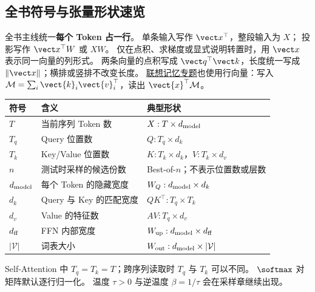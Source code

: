 \subsection{全书符号与张量形状速览}
\label{app:symbols}
全书主线统一\textbf{每个 Token 占一行}。
单条输入写作 $\vect x^\top$，整段输入为 $X$；
投影写作 $\vect x^\top W$ 或 $XW$。
仅在点积、求梯度或显式说明转置时，用 $\vect x$ 表示同一向量的列形式。
两条向量的点积写成 $\vect q^\top\vect k$，长度统一写成 $\|\vect x\|$；横排或竖排不改变长度。
\hyperref[intro:04-key-value-outer-product]{联想记忆专题}也使用行向量：写入 $\mathcal{M}=\sum_i \vect{k}_i\vect{v}_i^\top$，读出 $\vect{x}^\top\mathcal{M}$。

\begin{center}\small
\renewcommand{\arraystretch}{1.25}
\begin{tabularx}{\linewidth}{@{}p{27mm}p{39mm}X@{}}
\toprule
符号 & 含义 & 典型形状\\\midrule
$T$ & 当前序列 Token 数 & $X:T\times d_{\rm model}$\\
$T_q$ & Query 位置数 & $Q:T_q\times d_k$\\
$T_k$ & Key/Value 位置数 & $K:T_k\times d_k$，$V:T_k\times d_v$\\
$n$ & 测试时采样的候选份数 & Best-of-$n$；不表示位置数或层数\\
$d_{\rm model}$ & 每个 Token 的隐藏宽度 & $W_Q:d_{\rm model}\times d_k$\\
$d_k$ & Query 与 Key 的匹配宽度 & $QK^\top:T_q\times T_k$\\
$d_v$ & Value 的特征数 & $AV:T_q\times d_v$\\
$d_{\rm ff}$ & FFN 内部宽度 & $W_{\rm up}:d_{\rm model}\times d_{\rm ff}$\\
$|\mathcal V|$ & 词表大小 & $W_{\rm out}:d_{\rm model}\times|\mathcal V|$\\
\bottomrule
\end{tabularx}
\end{center}
Self-Attention 中 $T_q=T_k=T$；跨序列读取时 $T_q$ 与 $T_k$ 可以不同。
$\softmax$ 对矩阵默认逐行归一化。
温度 $\tau>0$ 与逆温度 $\beta=1/\tau$ 会在采样章继续出现。


